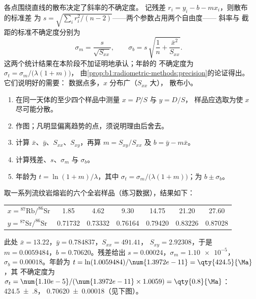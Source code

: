 各点围绕直线的散布决定了斜率的不确定度。
记残差 $r_i = y_i - b - m x_i$，则散布的标准差
为 $s = \sqrt{\sum_i r_i^2/(n-2)}$——两个参数占用两个自由度——
斜率与
截距的标准不确定度分别为
\[
  \sigma_m = \frac{s}{\sqrt{S_{xx}}}, \qquad
  \sigma_b = s\,\sqrt{\frac1n + \frac{\bar x^2}{S_{xx}}} .
\]
这两个统计结果在本阶段不加证明地承认；年龄的
不确定度为 $\sigma_t = \sigma_m/\bigl(\lambda(1 + m)\bigr)$，
由\cref{prop:b1:radiometric-methods:precision}的论证得出。它们说明好的需要：
数据点多，$x$ 分布广（$S_{xx}$ 大），
散布小。

\begin{method}[拟合等时线]\label{met:b1:radiometric-methods:isochron}
\begin{enumerate}
  \item 在同一天体的至少四个样品中测量 $x = P/S$ 与 $y = D/S$，
        样品应选取为使 $x$ 尽可能分散。
  \item 作图；凡明显偏离趋势的点，须说明理由后舍去。
  \item 计算 $\bar x$、$\bar y$、$S_{xx}$、$S_{xy}$，再算 $m = S_{xy}/S_{xx}$
        及 $b = \bar y - m \bar x$。
  \item 计算残差、$s$、$\sigma_m$ 与 $\sigma_b$。
  \item 年龄为 $t = \ln(1+m)/\lambda$，其中 $\sigma_t =
        \sigma_m/\bigl(\lambda(1+m)\bigr)$；为 $b \pm \sigma_b$。
\end{enumerate}
\end{method}

\begin{example}[一个虚构的流纹岩]\label{ex:b1:radiometric-methods:rhyolite}
取一系列流纹岩熔岩的六个全岩样品（练习数据），结果如下：
\begin{center}
\small
\begin{tabular}{|l|cccccc|}
\hline
$x = {}^{87}\mathrm{Rb}/^{86}\mathrm{Sr}$ & 1.85 & 4.62 & 9.30 & 14.75 & 21.20 & 27.60 \\
$y = {}^{87}\mathrm{Sr}/^{86}\mathrm{Sr}$ & 0.71732 & 0.73332 & 0.76164 & 0.79420 & 0.83226 & 0.87028 \\
\hline
\end{tabular}
\end{center}
此处 $\bar x = 13.22$，$\bar y = 0.784837$，$S_{xx} = 491.41$，
$S_{xy} = 2.92308$，于是 $m = 0.0059484$，$b = 0.70620$。残差给出
$s = 0.00024$，$\sigma_m = \num{1.10e-5}$，$\sigma_b = 0.00018$。年龄为
$t = \ln(1.0059484)/\num{1.3972e-11} = \qty{424.5}{\Ma}$，其
不确定度为 $\sigma_t = \num{1.10e-5}/(\num{1.3972e-11} \times 1.0059) = \qty{0.8}{\Ma}$：
\qty[uncertainty-mode=separate]{424.5(8)}{\Ma}，
\num[uncertainty-mode=separate]{0.70620(18)}（见下图）。
\end{example}

